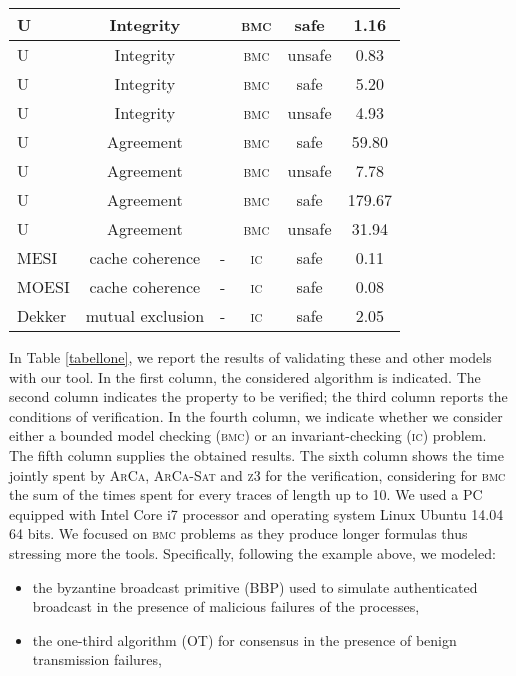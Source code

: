 \documentclass[11pt,a4paper]{article}
\begin{document}
{\begin{table}
{\begin{tabular}{|l|c|c|c|c|c|}
U  \cite{Biely07} & Integrity &  & \textsc{bmc} & safe & 1.16  \\ \hline
U  \cite{Biely07} & Integrity &  & \textsc{bmc} & unsafe & 0.83  \\ \hline
U  \cite{Biely07} & Integrity &  & \textsc{bmc} & safe & 5.20  \\ \hline
U  \cite{Biely07} & Integrity &  & \textsc{bmc} & unsafe & 4.93  \\ \hline
U  \cite{Biely07} & Agreement &  & \textsc{bmc} & safe & 59.80  \\ \hline
U  \cite{Biely07} & Agreement &  & \textsc{bmc} & unsafe & 7.78  \\ \hline
U  \cite{Biely07} & Agreement &  & \textsc{bmc} & safe & 179.67  \\ \hline
U  \cite{Biely07} & Agreement &  & \textsc{bmc} & unsafe & 31.94  \\ \hline
MESI \cite{Patel84} & cache coherence & - & \textsc{ic} & safe & 0.11  \\ \hline
MOESI \cite{MOESI} & cache coherence & - & \textsc{ic} & safe & 0.08  \\ \hline
Dekker \cite{Dekker} & mutual exclusion & - & \textsc{ic} & safe & 2.05  \\ \hline
\end{tabular}
}
\end{table}
In Table \ref{tabellone}, we report the results of validating these and other models with our tool.  In the first column, the considered algorithm is indicated.  The second column indicates the property to be verified; the third column reports the conditions of verification.  In the fourth column, we indicate whether we consider either a bounded model checking (\textsc{bmc}) or an invariant-checking (\textsc{ic}) problem.  The fifth column supplies the obtained results.  The sixth column shows the time jointly spent by \textsc{ArCa},  \textsc{ArCa-Sat} and \textsc{z3} for the verification, considering for \textsc{bmc} the sum of the times spent for every traces of length up to 10.  We used a PC equipped with Intel Core i7  processor and operating system Linux Ubuntu 14.04 64 bits.
We focused on \textsc{bmc} problems as they produce longer formulas thus stressing more the tools.
Specifically, following the example above, we modeled: 
\begin{itemize}
\item the byzantine broadcast primitive (BBP) \cite{toueg87} used to simulate authenticated broadcast in the presence of malicious failures of the processes, 
\item the one-third algorithm (OT) \cite{sharpie} for consensus in the presence of benign transmission failures, 

\end{itemize}}
\end{document}

